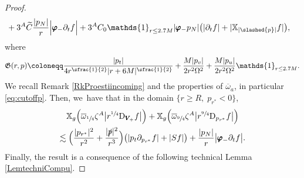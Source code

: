\documentclass[10pt]{amsart}
\theoremstyle{plain}
\theoremstyle{definition}
\newcommand\z{{\zeta}}
\newcommand\T{{\mathbb{X}}}
\begin{document}
\begin{proof}
\begin{align*}
& + 3^A \widetilde{C}\frac{|p_N|}{ r} \Big| \pmb{\varphi}_- \partial_t f \Big|+3^AC_0 \mathds{1}_{r \leq 2.7M} | \pmb{\varphi}_- p_N| \bigl(|\partial_t f | + |\T_{|\slashed{p}|} f | \bigr),
\end{align*}
where\vspace*{-5pt}
\begin{equation}\label{eq:DefCalG}
\mathfrak{G}(r,p) \coloneqq \frac{|p_t|}{4r^{\sfrac{1}{2}}|r+6M|^{\sfrac{1}{2}} }+\frac{M|p_v|}{2r^2 \Omega^2}+ \frac{M|p_u|}{2r^2 \Omega^2} \mathds{1}_{r \leq 2.7M}.
\end{equation}
We recall Remark \ref{RkProestiincoming} and the properties of $\overline{\omega}_a$, in particular \eqref{eq:cutoffp}. Then, we~have that in the domain $\{ r \geq R, \; p_{r^*} <0 \}$,\vspace*{-5pt}
\begin{multline*}
\T_g \Bigl(\overline{\omega}_{\sfrac{1}{4}} \z^A\big|r^{\sfrac{1}{4}} \mathrm{D}_{\pmb{V}_{\! +}} f \big| \Bigr) + \T_g \Bigl(\overline{\omega}_{\sfrac{9}{4}} \z^A \big| r^{\sfrac{9}{4}} \mathrm{D }_{p_{r^*}} f \big| \Bigr)\\
 \lesssim \Bigl(\frac{|p_{r^*}|^2}{r^2}+\frac{|\slashed{p}|^2}{r^3 } \Bigr) \bigl(|p_t \partial_{p_{r^*}} f| + |Sf| \bigr)
+\frac{|p_N|}{ r} \big| \pmb{\varphi}_- \partial_tf \big|.
\end{multline*}
Finally, the result is a consequence of the following technical Lemma \ref{LemtechniCompu}.
\end{proof}
\end{document}
